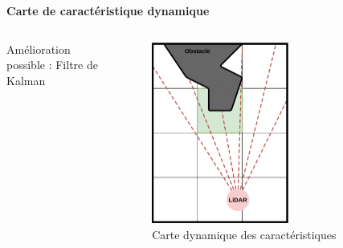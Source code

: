 \documentclass[aspectratio=169,10pt]{beamer}
\begin{document}
\begin{frame}{\textbf{Carte de caractéristique dynamique}}
\begin{columns}
\begin{column}{0.7\textwidth}
			Amélioration possible : Filtre de Kalman
		\end{column}
		\begin{column}{0.3\textwidth}
			\begin{figure}
				\centering
				\includegraphics[width=0.6\textwidth]{IMAGES/lidar_occurance_map.png}
				\caption{Carte dynamique des caractéristiques}
			\end{figure}
		\end{column}
	\end{columns}

\end{frame}
\end{document}
